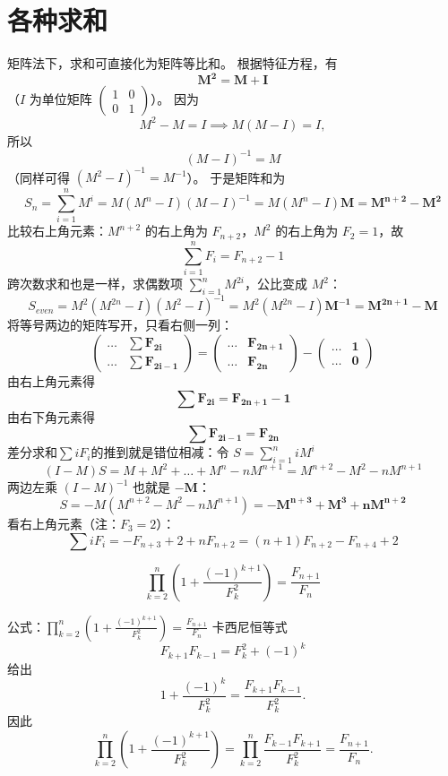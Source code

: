 \section{各种求和}
矩阵法下，求和可直接化为矩阵等比和。
根据特征方程，有 \[\mathbf{M^2 = M + I}\] （$I$ 为单位矩阵 $\begin{pmatrix} 1 & 0 \\ 0 & 1 \end{pmatrix}$）。
因为
\[
M^2 - M = I \implies M(M-I) = I,
\]
所以
\[
(M-I)^{-1} = M
\]
（同样可得 \((M^2-I)^{-1} = M^{-1}\)）。
于是矩阵和为
\[S_n = \sum_{i=1}^n M^i = M (M^n - I) (M-I)^{-1}= M(M^n - I)\mathbf{M} = \mathbf{M^{n+2} - M^2} \]
比较右上角元素：$M^{n+2}$ 的右上角为 $F_{n+2}$，$M^2$ 的右上角为 $F_2=1$，故
\[\sum_{i=1}^n F_i = F_{n+2} - 1\]
跨次数求和也是一样，求偶数项 $\sum_{i=1}^n M^{2i}$，公比变成 $M^2$：
\[S_{even} = M^2 (M^{2n} - I) (M^2 - I)^{-1} = M^2(M^{2n} - I)\mathbf{M^{-1}} = \mathbf{M^{2n+1} - M}\]
将等号两边的矩阵写开，只看右侧一列：
$$ \begin{pmatrix} \dots & \mathbf{\sum F_{2i}} \\ \dots & \mathbf{\sum F_{2i-1}} \end{pmatrix} = \begin{pmatrix} \dots & \mathbf{F_{2n+1}} \\ \dots & \mathbf{F_{2n}} \end{pmatrix} - \begin{pmatrix} \dots & \mathbf{1} \\ \dots & \mathbf{0} \end{pmatrix} $$
由右上角元素得
\[\mathbf{\sum F_{2i} = F_{2n+1} - 1}\]
由右下角元素得
\[\mathbf{\sum F_{2i-1} = F_{2n}}\]
差分求和$\sum i F_i$的推到就是错位相减：令 $S = \sum_{i=1}^n i M^i$
\[(I-M)S = M + M^2 + \dots + M^n - n M^{n+1} = M^{n+2} - M^2 - n M^{n+1}\]
两边左乘 $(I-M)^{-1}$ 也就是 $\mathbf{-M}$：$$ S = -M(M^{n+2} - M^2 - n M^{n+1}) = \mathbf{-M^{n+3} + M^3 + n M^{n+2}} $$
看右上角元素（注：$F_3=2$）：\[\sum i F_i = -F_{n+3} + 2 + n F_{n+2}=(n+1)F_{n+2} - F_{n+4} + 2\]

\begin{conclusion}
    \[\prod_{k=2}^n \left(1 + \frac{(-1)^{k+1}}{F_k^2}\right) = \frac{F_{n+1}}{F_n}\]
\end{conclusion}
公式：$\prod_{k=2}^n \left(1 + \frac{(-1)^{k+1}}{F_k^2}\right) = \frac{F_{n+1}}{F_n}$
卡西尼恒等式
\[
F_{k+1}F_{k-1} = F_k^2 + (-1)^k
\]
给出
\[
1 + \frac{(-1)^k}{F_k^2} = \frac{F_{k+1}F_{k-1}}{F_k^2}.
\]
因此
\[
\prod_{k=2}^n \left(1 + \frac{(-1)^{k+1}}{F_k^2}\right)
= \prod_{k=2}^n \frac{F_{k-1}F_{k+1}}{F_k^2}
= \frac{F_{n+1}}{F_n}.
\]

